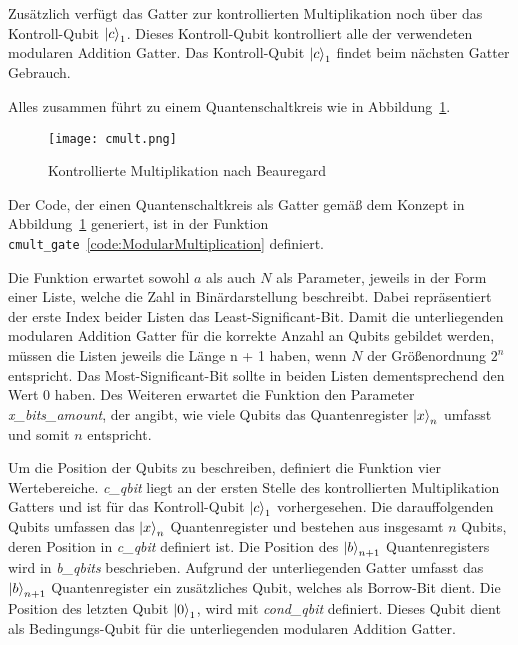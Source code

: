 Zusätzlich verfügt das Gatter zur kontrollierten Multiplikation noch über das Kontroll-Qubit \(\ket{c}_1\).
Dieses Kontroll-Qubit kontrolliert alle der verwendeten modularen Addition Gatter.
Das Kontroll-Qubit \(\ket{c}_1\) findet beim nächsten Gatter Gebrauch.

Alles zusammen führt zu einem Quantenschaltkreis wie in Abbildung~\ref{fig:cmult}.
\begin{figure}[H]
  \centering
  \texttt{[image: cmult.png]}
  \caption{Kontrollierte Multiplikation nach Beauregard~\cite{beauregard2003circuit}}
  \label{fig:cmult}
\end{figure}



\vspace{1em}

Der Code, der einen Quantenschaltkreis als Gatter gemäß dem Konzept in Abbildung~\ref{fig:cmult} generiert, 
ist in der Funktion \texttt{cmult\_gate}~\ref{code:ModularMultiplication} definiert.

Die Funktion erwartet sowohl \(a\) als auch \(N\) als Parameter, 
jeweils in der Form einer Liste, welche die Zahl in Binärdarstellung beschreibt.
Dabei repräsentiert der erste Index beider Listen das Least-Significant-Bit.
Damit die unterliegenden modularen Addition Gatter für die korrekte Anzahl an Qubits gebildet werden, 
müssen die Listen jeweils die Länge n + 1 haben, wenn \(N\) der Größenordnung \(2^n\) entspricht.
Das Most-Significant-Bit sollte in beiden Listen dementsprechend den Wert \(0\) haben.
Des Weiteren erwartet die Funktion den Parameter \textit{x\_bits\_amount}, der angibt, 
wie viele Qubits das Quantenregister \(\ket{x}_n\) umfasst 
und somit \(n\) entspricht. 

Um die Position der Qubits zu beschreiben, 
definiert die Funktion vier Wertebereiche.
\textit{c\_qbit} liegt an der ersten Stelle des kontrollierten Multiplikation Gatters und 
ist für das Kontroll-Qubit \(\ket{c}_1\) vorhergesehen.
Die darauffolgenden Qubits umfassen das \(\ket{x}_n\) Quantenregister und bestehen aus insgesamt \(n\) Qubits, 
deren Position in \textit{c\_qbit} definiert ist.
Die Position des \(\ket{b}_{n+1}\) Quantenregisters wird in \textit{b\_qbits} beschrieben.
Aufgrund der unterliegenden Gatter umfasst das \(\ket{b}_{n+1}\) Quantenregister ein zusätzliches Qubit, 
welches als Borrow-Bit dient.
Die Position des letzten Qubit \(\ket{0}_1\), 
wird mit \textit{cond\_qbit} definiert.
Dieses Qubit dient als Bedingungs-Qubit für die unterliegenden modularen Addition Gatter.

